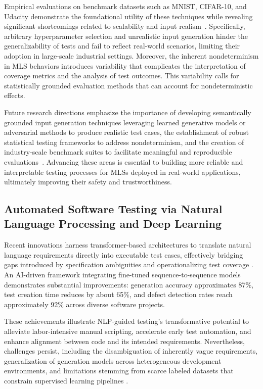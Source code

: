 \documentclass[sigconf]{acmart}
\begin{document}
Empirical evaluations on benchmark datasets such as MNIST, CIFAR-10, and Udacity demonstrate the foundational utility of these techniques while revealing significant shortcomings related to scalability and input realism~\cite{ref27}. Specifically, arbitrary hyperparameter selection and unrealistic input generation hinder the generalizability of tests and fail to reflect real-world scenarios, limiting their adoption in large-scale industrial settings. Moreover, the inherent nondeterminism in MLS behaviors introduces variability that complicates the interpretation of coverage metrics and the analysis of test outcomes. This variability calls for statistically grounded evaluation methods that can account for nondeterministic effects.

Future research directions emphasize the importance of developing semantically grounded input generation techniques leveraging learned generative models or adversarial methods to produce realistic test cases, the establishment of robust statistical testing frameworks to address nondeterminism, and the creation of industry-scale benchmark suites to facilitate meaningful and reproducible evaluations~\cite{ref27}. Advancing these areas is essential to building more reliable and interpretable testing processes for MLSs deployed in real-world applications, ultimately improving their safety and trustworthiness.

\subsection{Automated Software Testing via Natural Language Processing and Deep Learning}

Recent innovations harness transformer-based architectures to translate natural language requirements directly into executable test cases, effectively bridging gaps introduced by specification ambiguities and operationalizing test coverage \cite{ref30}. An AI-driven framework integrating fine-tuned sequence-to-sequence models demonstrates substantial improvements: generation accuracy approximates 87\%, test creation time reduces by about 65\%, and defect detection rates reach approximately 92\% across diverse software projects.

These achievements illustrate NLP-guided testing's transformative potential to alleviate labor-intensive manual scripting, accelerate early test automation, and enhance alignment between code and its intended requirements. Nevertheless, challenges persist, including the disambiguation of inherently vague requirements, generalization of generation models across heterogeneous development environments, and limitations stemming from scarce labeled datasets that constrain supervised learning pipelines \cite{ref30}.
\end{document}
